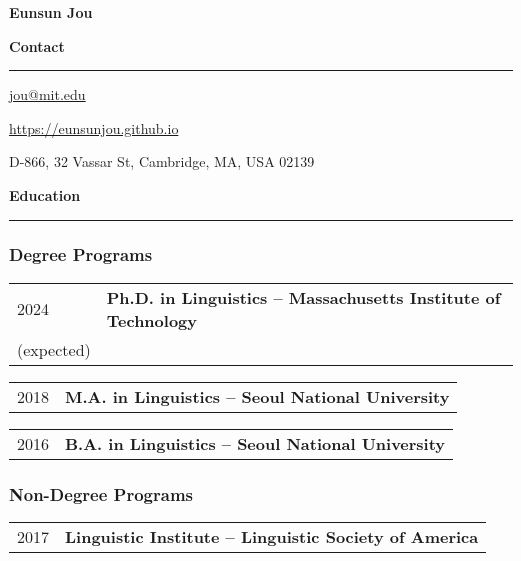 \documentclass[11pt]{article}
\newcommand{\sect}[1]{{\fontsize{15}{25}\selectfont \textbf{#1}} {\vspace{0.1cm}} \hrule {\vspace{0.3cm}}}
\begin{document}
\begin{center}
{\Large \textbf{Eunsun Jou}}
\end{center}

\thispagestyle{firstpage}

\sect{Contact}

\href{mailto:jou@mit.edu}{jou@mit.edu}

\href{https://eunsunjou.github.io}{https://eunsunjou.github.io}

D-866, 32 Vassar St, Cambridge, MA, USA 02139

\vspace{1cm}

\sect{Education}

\subsubsection*{Degree Programs}
\begin{tabular}{p{}|p{}}
    {2024}&{\textbf{Ph.D. in Linguistics -- Massachusetts Institute of Technology}}\\
    {(expected)}&{}\\
\end{tabular}

\vspace{0.2cm}

\begin{tabular}{p{}|p{}}
	{2018}&{\textbf{M.A. in Linguistics -- Seoul National University}}\\
 \end{tabular}

\vspace{0.2cm}

\begin{tabular}{p{}|p{}}
   {2016}&{\textbf{B.A. in Linguistics -- Seoul National University}}\\
\end{tabular}

\subsubsection*{Non-Degree Programs}
\begin{tabular}{p{}|p{}}
	{2017}&{\textbf{Linguistic Institute -- Linguistic Society of America}}\\
\end{tabular}
\end{document}
